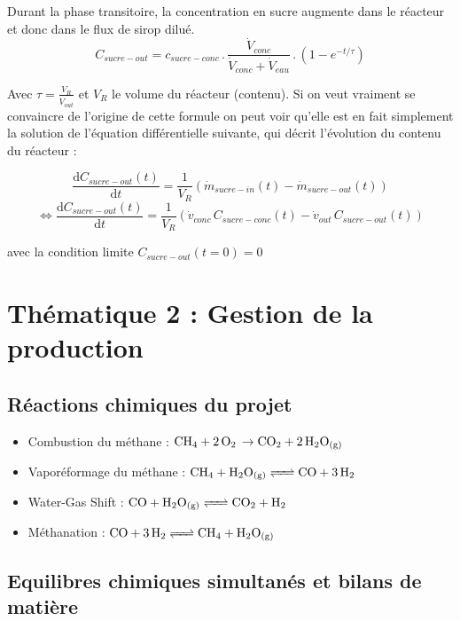 \documentclass[fr]{../../../eplsummary}
\begin{document}
\par Durant la phase transitoire, la concentration en sucre augmente dans le réacteur et donc dans le flux de sirop dilué.\\

$$C_{sucre-out} = c_{sucre-conc} \, . \, \frac{\dot{V}_{conc}}{\dot{V}_{conc} + \dot{V}_{eau}} \, . \, (1-e^{-t/\tau})$$

\par Avec $\tau = \frac{V_{R}}{\dot{V}_{out}}$ et $V_{R}$ le volume du réacteur (contenu). Si on veut vraiment se convaincre de l'origine de cette formule on peut voir qu'elle est en fait simplement la solution de l’équation différentielle suivante, qui décrit l’évolution du contenu du réacteur : 

$$\frac{\mathrm{d} C_{sucre-out}(t)}{\mathrm{d}t} = \frac{1}{V_{R}}(\dot{m}_{sucre-in}(t) - \dot{m}_{sucre-out}(t))$$
$$\Leftrightarrow \frac{\mathrm{d} C_{sucre-out}(t)}{\mathrm{d}t} = \frac{1}{V_{R}}(\dot{v}_{conc} \, C_{sucre-conc}(t) - \dot{v}_{out} \, C_{sucre-out}(t))$$

\par avec la condition limite $C_{sucre-out}(t=0) = 0$


\section{Thématique 2 : Gestion de la production}

\subsection{Réactions chimiques du projet}

\begin{itemize}
\item Combustion du méthane : $\ce{CH_{4} + 2 O_{2} \rightarrow CO_{2} + 2 H_{2}O_{(g)}}$\\
\item Vaporéformage du méthane : $\ce{CH_{4} + H_{2}O_{(g)} <=> CO + 3 H_{2}}$\\
\item Water-Gas Shift : $\ce{CO + H_{2}O_{(g)} <=> CO_{2} + H_{2}}$\\
\item Méthanation : $\ce{CO + 3H_{2} <=> CH_{4} + H_{2}O_{(g)}}$
\end{itemize}

\subsection{Equilibres chimiques simultanés et bilans de matière}
\end{document}
